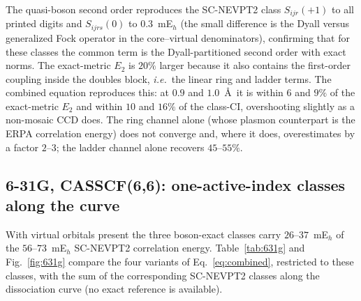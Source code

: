 \documentclass[aip,jcp,reprint,noshowkeys,superscriptaddress]{revtex4-1}
\newcommand{\ie}{\textit{i.e.}}
\begin{document}
The quasi-boson second order reproduces the SC-NEVPT2 class $S_{ijr}(+1)$
to all printed digits and $S_{ijrs}(0)$ to $0.3$~mE$_h$ (the small
difference is the Dyall versus generalized Fock operator in the
core--virtual denominators), confirming that for these classes the common
term is the Dyall-partitioned second order with exact norms.  The
exact-metric $E_2$ is $20\%$ larger because it also contains the first-order
coupling inside the doubles block, \ie\ the linear ring and ladder terms.
The combined equation reproduces this: at $0.9$ and $1.0$~\AA\ it is within
$6$ and $9\%$ of the exact-metric $E_2$ and within $10$ and $16\%$ of the
class-CI, overshooting slightly as a non-mosaic CCD does.  The ring channel
alone (whose plasmon counterpart is the ERPA correlation energy) does not
converge and, where it does, overestimates by a factor $2$--$3$; the ladder
channel alone recovers $45$--$55\%$.

\subsection{6-31G, CASSCF(6,6): one-active-index classes along the curve}

With virtual orbitals present the three boson-exact classes carry
$26$--$37$~mE$_h$ of the $56$--$73$~mE$_h$ SC-NEVPT2 correlation energy.
Table~\ref{tab:631g} and Fig.~\ref{fig:631g} compare the four variants of
Eq.~\eqref{eq:combined}, restricted to these classes, with the sum of the
corresponding SC-NEVPT2 classes along the dissociation curve (no exact
reference is available).
\end{document}
